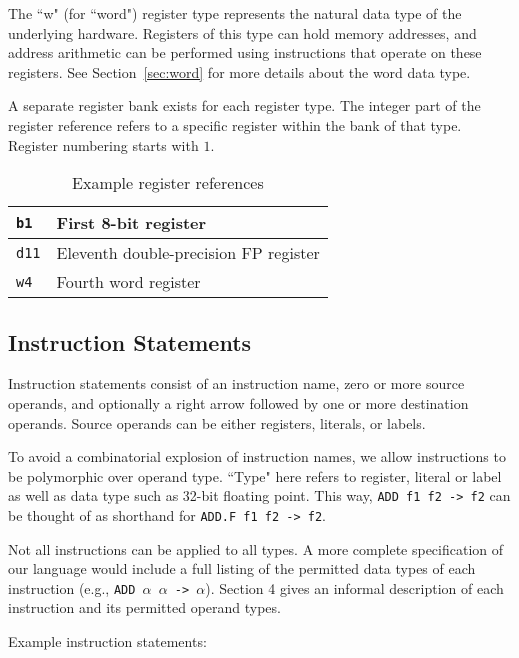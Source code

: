 The ``w" (for ``word") register type represents the natural data type of the underlying hardware.
Registers of this type can hold memory addresses, and address arithmetic
can be performed using instructions that operate on these registers.
See Section~\ref{sec:word} for more details about the word data type.

A separate register bank exists for each register type. The integer
part of the register reference refers to a specific register
within the bank of that type. Register numbering starts with $1$.

\begin{table}[h!]
  \begin{center}
    \begin{tabular}{|l|l|}
      \hline
      \texttt{b1}  & First 8-bit register                  \\ \hline
      \texttt{d11} & Eleventh double-precision FP register \\ \hline
      \texttt{w4}  & Fourth word register                  \\ \hline
    \end{tabular}
  \end{center}
  \caption{Example register references}
\end{table}

\subsection{Instruction Statements}

Instruction statements consist of an instruction name, zero or
more source operands, and optionally a right arrow followed by
one or more destination operands. Source operands can be either registers,
literals, or labels.

To avoid a combinatorial explosion of instruction names,
we allow instructions to be polymorphic over operand type.
``Type" here refers to register, literal or label as well
as data type such as 32-bit floating point.
This way, \texttt{ADD f1 f2 -> f2} can be thought of as shorthand
for \texttt{ADD.F f1 f2 -> f2}.

Not all instructions can be applied to all types.
A more complete specification of our language would include
a full listing of the permitted data types of each instruction
(e.g., \texttt{ADD $\alpha$ $\alpha$ -> $\alpha$}). Section 4 gives an informal description of each instruction
and its permitted operand types.

Example instruction statements:

